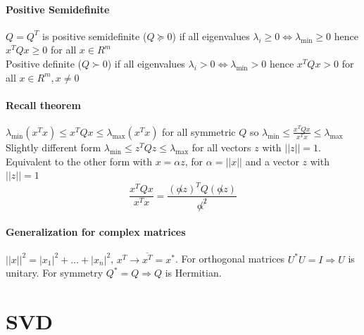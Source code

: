 \documentclass[10pt]{report}
\begin{document}
\paragraph{Positive Semidefinite} $Q = Q^T$ is positive semidefinite ($Q \succeq 0$) if all eigenvalues $\lambda_i \geq 0 \Leftrightarrow \lambda_{\min} \geq 0$ hence $x^T Q x\geq 0$ for all $x\in R^m$\\
Positive definite ($Q \succ 0$) if all eigenvalues $\lambda_i > 0 \Leftrightarrow \lambda_{\min} > 0$ hence $x^TQx > 0$ for all $x \in R^m, x\neq 0$
\paragraph{Recall theorem} $\lambda_{\min}(x^T x) \leq x^T Q x \leq \lambda_{\max}(x^T x)$ for all symmetric $Q$ so $\lambda_{\min} \leq \frac{x^T Q x}{x^T x} \leq \lambda_{\max}$\\
Slightly different form $\lambda_{\min} \leq z^T Q z \leq \lambda_{\max}$ for all vectors $z$ with $||z|| = 1$. Equivalent to the other form with $x = \alpha z$, for $\alpha = ||x||$ and a vector $z$ with $||z|| = 1$
$$ \frac{x^T Q x}{x^T x} = \frac{(\not\alpha z)^T Q (\not\alpha z)}{\not\alpha^{\not 2}}$$
\paragraph{Generalization for complex matrices} $||x||^2 = |x_1|^2 + \ldots + |x_n|^2$, $x^T \longrightarrow \overline{x^T} = x^*$. For orthogonal matrices $U^*U=I \Rightarrow U$ is unitary. For symmetry $Q^* = Q \Rightarrow Q$ is Hermitian.
\section{SVD}
\end{document}
